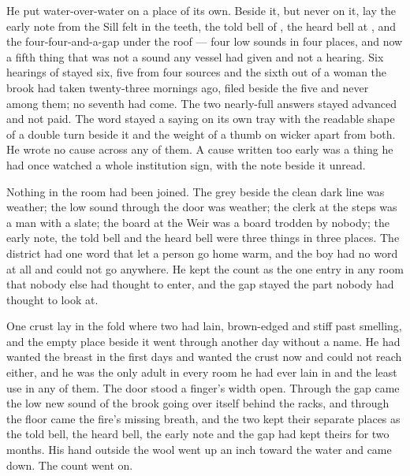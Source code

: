 He put water-over-water on a place of its own. Beside it, but never on it, lay the early note from the Sill felt in the teeth, the told bell of , the heard bell at , and the four-four-and-a-gap under the roof --- four low sounds in four places, and now a fifth thing that was not a sound any vessel had given and not a hearing. Six hearings of  stayed six, five from four sources and the sixth out of a woman the brook had taken twenty-three mornings ago, filed beside the five and never among them; no seventh had come. The two nearly-full answers stayed advanced and not paid. The word stayed a saying on its own tray with the readable shape of a double turn beside it and the weight of a thumb on wicker apart from both. He wrote no cause across any of them. A cause written too early was a thing he had once watched a whole institution sign, with the note beside it unread.

Nothing in the room had been joined. The grey beside the clean dark line was weather; the low sound through the door was weather; the clerk at the steps was a man with a slate; the board at the Weir was a board trodden by nobody; the early note, the told bell and the heard bell were three things in three places. The district had one word that let a person go home warm, and the boy had no word at all and could not go anywhere. He kept the count as the one entry in any room that nobody else had thought to enter, and the gap stayed the part nobody had thought to look at.

One crust lay in the fold where two had lain, brown-edged and stiff past smelling, and the empty place beside it went through another day without a name. He had wanted the breast in the first days and wanted the crust now and could not reach either, and he was the only adult in every room he had ever lain in and the least use in any of them. The door stood a finger's width open. Through the gap came the low new sound of the brook going over itself behind the racks, and through the floor came the fire's missing breath, and the two kept their separate places as the told bell, the heard bell, the early note and the gap had kept theirs for two months. His hand outside the wool went up an inch toward the water and came down. The count went on.
